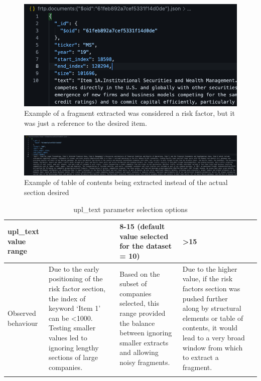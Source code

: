 \documentclass[12pt,MSc,a4paper,oneside]{muthesis}
\begin{document}
    \label{appendix:5}
    \begin{figure}[h]
      \centering
      \includegraphics[scale=0.5]{images/fragment extracted.png}
      \caption{Example of a fragment extracted was considered a risk factor, but it was just a reference to the desired item.}
    \end{figure}

    \label{appendix:6}
    \begin{figure}[h]
      \centering
      \includegraphics[scale=0.10]{images/example.png}
      \caption{Example of table of contents being extracted instead of the actual section desired}
    \end{figure}

    \label{appendix:7}
    \begin{table}

      \label{tab:freq}
      \begin{tabularx}{\textwidth}{|L|X|X|X|L|}
        \toprule
        upl\_text value range &  & 8-15 (default value selected for the dataset = 10) & \textgreater 15\\
        \midrule
        Observed behaviour & Due to the early positioning of the risk factor section, the index of keyword ‘Item 1' can be \textless 1000. Testing smaller values led to ignoring lengthy sections of large companies. & Based on the subset of companies selected, this range provided the balance between ignoring smaller extracts and allowing noisy fragments. & Due to the higher value, if the risk factors section was pushed further along by structural elements or table of contents, it would lead to a very broad window from which to extract a fragment.\\
        \bottomrule
        \caption{upl\_text parameter selection options}
      \end{tabularx}
    \end{table}
\end{document}
